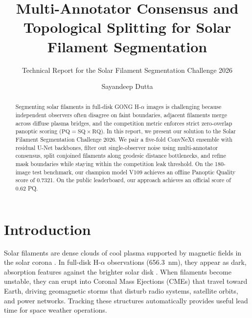 \documentclass[sigconf]{acmart}
\begin{document}
\title{Multi-Annotator Consensus and Topological Splitting for Solar Filament Segmentation}
\subtitle{Technical Report for the Solar Filament Segmentation Challenge 2026}

\author{Sayandeep Dutta}

\begin{abstract}
Segmenting solar filaments in full-disk GONG H-$\alpha$ images is challenging because independent observers often disagree on faint boundaries, adjacent filaments merge across diffuse plasma bridges, and the competition metric enforces strict zero-overlap panoptic scoring ($\text{PQ} = \text{SQ} \times \text{RQ}$). In this report, we present our solution to the Solar Filament Segmentation Challenge 2026. We pair a five-fold ConvNeXt ensemble with residual U-Net backbones, filter out single-observer noise using multi-annotator consensus, split conjoined filaments along geodesic distance bottlenecks, and refine mask boundaries while staying within the competition leak threshold. On the 180-image test benchmark, our champion model V109 achieves an offline Panoptic Quality score of 0.7321. On the public leaderboard, our approach achieves an official score of 0.62 PQ.
\end{abstract}


\maketitle

\section{Introduction}
Solar filaments are dense clouds of cool plasma supported by magnetic fields in the solar corona \cite{ahmadzadeh2024dataset}. In full-disk H-$\alpha$ observations (656.3~nm), they appear as dark, absorption features against the brighter solar disk \cite{filament-segmentation-2026}. When filaments become unstable, they can erupt into Coronal Mass Ejections (CMEs) that travel toward Earth, driving geomagnetic storms that disturb radio systems, satellite orbits, and power networks. Tracking these structures automatically provides useful lead time for space weather operations.
\end{document}
